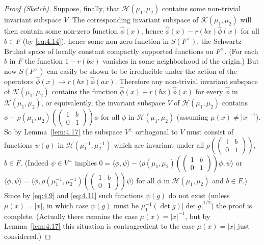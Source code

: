 \begin{proof}[Proof (Sketch)]
Suppose, finally, that $\mathcal{H}(\mu_1, \mu_2)$ contains some non-trivial invariant subspace $V$. The corresponding invariant subspace of $\mathcal{K}(\mu_1, \mu_2)$ will then contain some non-zero function $\hat{\phi}(x)$, hence $\hat{\phi}(x) - r(bx)\hat{\phi}(x)$ for all $b \in F$ (by \eqref{eq:4.14}), hence some non-zero function in $S(F^{\times})$, the Schwartz-Bruhat space of locally constant compactly supported functions on $F^{\times}$. (For each $b$ in $F$ the function $1 - r(bx)$ vanishes in some neighborhood of the origin.) But now $S(F^{\times})$ can easily be shown to be irreducible under the action of the operators $\hat{\phi}(x) \to r(bx)\hat{\phi}(ax)$. Therefore any non-trivial invariant subspace of $\mathcal{K}(\mu_1, \mu_2)$ contains the function $\hat{\phi}(x) - r(bx)\hat{\phi}(x)$ for every $\hat{\phi}$ in $\mathcal{K}(\mu_1, \mu_2)$, or equivalently, the invariant subspace $V$ of $\mathcal{H}(\mu_1, \mu_2)$ contains $\phi - \rho(\mu_1, \mu_2)\left(\begin{pmatrix} 1 & b \\ 0 & 1 \end{pmatrix}\right)\phi$ for all $\phi$ in $\mathcal{H}(\mu_1, \mu_2)$ (assuming $\mu(x) \neq |x|^{-1}$). So by Lemma~\ref{lem:4.17} the subspace $V^{\perp}$ orthogonal to $V$ must consist of functions $\psi(g)$ in $\mathcal{H}(\mu_1^{-1}, \mu_2^{-1})$ which are invariant under all $\rho\left(\begin{pmatrix} 1 & b \\ 0 & 1 \end{pmatrix}\right)$, $b \in F$. (Indeed $\psi \in V^{\perp}$ implies $0 = \langle \phi, \psi \rangle - \langle \rho(\mu_1, \mu_2)\left(\begin{pmatrix} 1 & b \\ 0 & 1 \end{pmatrix}\right)\phi, \psi \rangle$ or $\langle \phi, \psi \rangle = \langle \phi, \rho(\mu_1^{-1}, \mu_2^{-1})\left(\begin{pmatrix} 1 & b \\ 0 & 1 \end{pmatrix}\right)\psi \rangle$ for all $\phi$ in $\mathcal{H}(\mu_1, \mu_2)$ and $b \in F$.) Since by \eqref{eq:4.9} and \eqref{eq:4.11} such functions $\psi(g)$ do not exist (unless $\mu(x) = |x|$, in which case $\psi(g)$ must be $\mu_1^{-1}(\det g)|\det g|^{1/2}$) the proof is complete. (Actually there remains the case $\mu(x) = |x|^{-1}$, but by Lemma~\ref{lem:4.17} this situation is contragredient to the case $\mu(x) = |x|$ just considered.)

\end{proof}

